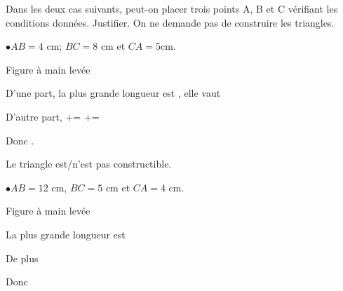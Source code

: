\documentclass[a4paper]{book}
\begin{document}
    \begin{exemple}
        Dans les deux cas suivants, peut-on placer trois points A, B et C vérifiant les conditions données. Justifier. On ne demande pas de construire les triangles.

        \medskip

        \begin{minipage}{0.48\linewidth}
            $\bullet AB=4$ cm; $BC=8$ cm et $CA=5 $cm.

            \begin{center}
                \small{Figure à main levée}
                
            \end{center}

            D'une part, la plus grande longueur est \points[2] , elle vaut~\points[1]

            \medskip
            
            D'autre part, \points[2]+\points[2] = \points[2]+\points[2] = \points[3]

            \bigskip

            Donc \points[10].

            \bigskip

            Le triangle est/n'est pas constructible.            
        \end{minipage}
        \hfill
        \vline
        \hfill
        \begin{minipage}{0.49\linewidth}
            $\bullet AB=12$ cm, $BC=5$ cm et $CA=4$ cm.

            \begin{center}
                \small{Figure à main levée}
                
            \end{center}

            La plus grande longueur est \points[10]

            \medskip 
            
            De plus \points[10]

            \bigskip

            Donc \points[10]

            \bigskip

            \points[10]
        \end{minipage}
    \end{exemple}
\end{document}
